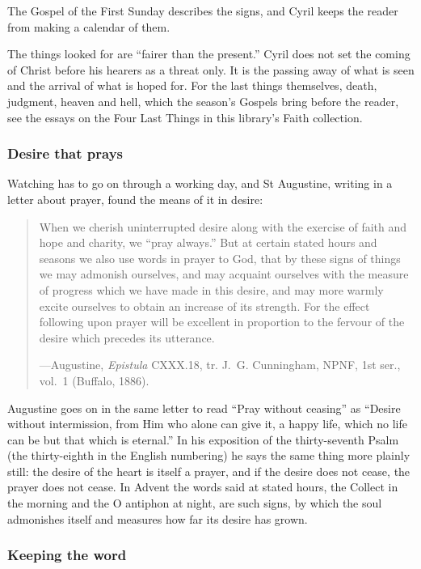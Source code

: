 The Gospel of the First Sunday describes the signs, and Cyril keeps the reader from making a
calendar of them.

The things looked for are ``fairer than the present.'' Cyril does not set the coming of Christ
before his hearers as a threat only. It is the passing away of what is seen and the arrival of
what is hoped for. For the last things themselves, death, judgment, heaven and hell, which the
season's Gospels bring before the reader, see the essays on the Four Last Things in this library's
Faith collection.

\subsubsection{Desire that prays}

Watching has to go on through a working day, and St Augustine, writing in a letter about prayer,
found the means of it in desire:

\begin{quote}
When we cherish uninterrupted desire along with the exercise of faith and hope and charity, we
``pray always.'' But at certain stated hours and seasons we also use words in prayer to God, that
by these signs of things we may admonish ourselves, and may acquaint ourselves with the measure of
progress which we have made in this desire, and may more warmly excite ourselves to obtain an
increase of its strength. For the effect following upon prayer will be excellent in proportion to
the fervour of the desire which precedes its utterance.\par
{\smallskip\noindent\small ---Augustine, \textit{Epistula} CXXX.18, tr. J.~G. Cunningham, NPNF,
1st ser., vol.~1 (Buffalo, 1886).\par}
\end{quote}

Augustine goes on in the same letter to read ``Pray without ceasing'' as ``Desire without
intermission, from Him who alone can give it, a happy life, which no life can be but that which is
eternal.'' In his exposition of the
thirty-seventh Psalm (the thirty-eighth in the English numbering) he says the same thing more
plainly still: the desire of the heart is itself a prayer, and if the desire does not cease, the
prayer does not cease. In Advent the words said at stated hours, the Collect in the morning and
the O antiphon at night, are such signs, by which the soul admonishes itself and measures how far
its desire has grown.

\subsubsection{Keeping the word}

